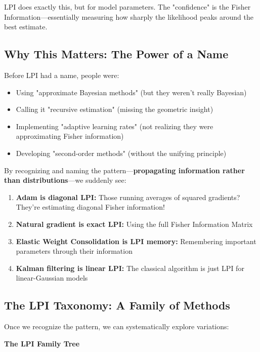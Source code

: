 \documentclass[11pt]{article}
\begin{document}
LPI does exactly this, but for model parameters. The "confidence" is the Fisher Information—essentially measuring how sharply the likelihood peaks around the best estimate.

\subsection{Why This Matters: The Power of a Name}

Before LPI had a name, people were:
\begin{itemize}
\item Using "approximate Bayesian methods" (but they weren't really Bayesian)
\item Calling it "recursive estimation" (missing the geometric insight)
\item Implementing "adaptive learning rates" (not realizing they were approximating Fisher information)
\item Developing "second-order methods" (without the unifying principle)
\end{itemize}

By recognizing and naming the pattern—\textbf{propagating information rather than distributions}—we suddenly see:

\begin{enumerate}
\item \textbf{Adam is diagonal LPI:} Those running averages of squared gradients? They're estimating diagonal Fisher information!
\item \textbf{Natural gradient is exact LPI:} Using the full Fisher Information Matrix
\item \textbf{Elastic Weight Consolidation is LPI memory:} Remembering important parameters through their information
\item \textbf{Kalman filtering is linear LPI:} The classical algorithm is just LPI for linear-Gaussian models
\end{enumerate}

\subsection{The LPI Taxonomy: A Family of Methods}

Once we recognize the pattern, we can systematically explore variations:

\begin{center}
\textbf{The LPI Family Tree}
\end{center}
\end{document}
